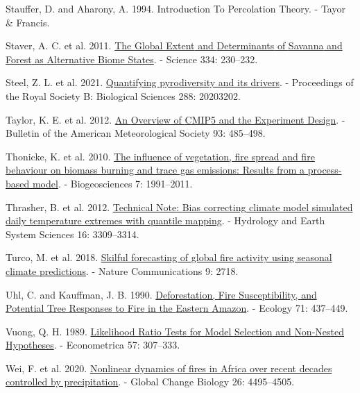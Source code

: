 \documentclass[
]{article}
\newlength{\cslhangindent}
\newenvironment{CSLReferences}[2] %
 {\begin{list}{}{%
  \setlength{\itemindent}{0pt}
  \setlength{\leftmargin}{0pt}
  \setlength{\parsep}{0pt}
  \ifodd #1
   \setlength{\leftmargin}{\cslhangindent}
   \setlength{\itemindent}{-1\cslhangindent}
  \fi
  \setlength{\itemsep}{#2\baselineskip}}}
 {\end{list}}
\begin{document}
\begin{CSLReferences}{1}{1}
Stauffer, D. and Aharony, A. 1994. Introduction {To Percolation Theory}.
- {Tayor \& Francis}.

Staver, A. C. et al. 2011.
\href{https://doi.org/10.1126/science.1210465}{The {Global Extent} and
{Determinants} of {Savanna} and {Forest} as {Alternative Biome States}}.
- Science 334: 230--232.

Steel, Z. L. et al. 2021.
\href{https://doi.org/10.1098/rspb.2020.3202}{Quantifying pyrodiversity
and its drivers}. - Proceedings of the Royal Society B: Biological
Sciences 288: 20203202.

Taylor, K. E. et al. 2012.
\href{https://doi.org/10.1175/BAMS-D-11-00094.1}{An {Overview} of
{CMIP5} and the {Experiment Design}}. - Bulletin of the American
Meteorological Society 93: 485--498.

Thonicke, K. et al. 2010.
\href{https://doi.org/10.5194/bg-7-1991-2010}{The influence of
vegetation, fire spread and fire behaviour on biomass burning and trace
gas emissions: Results from a process-based model}. - Biogeosciences 7:
1991--2011.

Thrasher, B. et al. 2012.
\href{https://doi.org/10.5194/hess-16-3309-2012}{Technical {Note}:
{Bias} correcting climate model simulated daily temperature extremes
with quantile mapping}. - Hydrology and Earth System Sciences 16:
3309--3314.

Turco, M. et al. 2018.
\href{https://doi.org/10.1038/s41467-018-05250-0}{Skilful forecasting of
global fire activity using seasonal climate predictions}. - Nature
Communications 9: 2718.

Uhl, C. and Kauffman, J. B. 1990.
\href{https://doi.org/10.2307/1940299}{Deforestation, {Fire
Susceptibility}, and {Potential Tree Responses} to {Fire} in the
{Eastern Amazon}}. - Ecology 71: 437--449.

Vuong, Q. H. 1989. \href{https://doi.org/10.2307/1912557}{Likelihood
{Ratio Tests} for {Model Selection} and {Non-Nested Hypotheses}}. -
Econometrica 57: 307--333.

Wei, F. et al. 2020. \href{https://doi.org/10.1111/gcb.15190}{Nonlinear
dynamics of fires in {Africa} over recent decades controlled by
precipitation}. - Global Change Biology 26: 4495--4505.


\end{CSLReferences}
\end{document}
